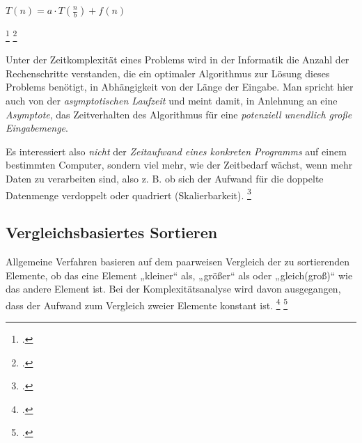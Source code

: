 \documentclass{lehramt-informatik-haupt}
\begin{document}
$T(n) = a \cdot T(\frac{n}{b}) + f(n)$

\footcite{wiki:master-theorem}
\footcite[Seite 19-35 (PDF 11-24)]{aud:fs:2}

%

\begin{liExkurs}%
Unter der Zeitkomplexität eines Problems wird in der Informatik die
Anzahl der Rechenschritte verstanden, die ein optimaler Algorithmus zur
Lösung dieses Problems benötigt, in Abhängigkeit von der Länge der
Eingabe. Man spricht hier auch von der \emph{asymptotischen Laufzeit}
und meint damit, in Anlehnung an eine \emph{Asymptote}, das
Zeitverhalten des Algorithmus für eine \emph{potenziell unendlich große
Eingabemenge}.

Es interessiert also \emph{nicht} der \emph{Zeitaufwand eines konkreten
Programms} auf einem bestimmten Computer, sondern viel mehr, wie der
Zeitbedarf wächst, wenn mehr Daten zu verarbeiten sind, also z. B. ob
sich der Aufwand für die doppelte Datenmenge verdoppelt oder quadriert
(Skalierbarkeit).
\footcite{wiki:zeitkomplexitaet}
\end{liExkurs}

\subsection{Vergleichsbasiertes Sortieren}

Allgemeine Verfahren basieren auf dem paarweisen Vergleich der zu
sortierenden Elemente, ob das eine Element „kleiner“ als, „größer“ als
oder „gleich(groß)“ wie das andere Element ist. Bei der
Komplexitätsanalyse wird davon ausgegangen, dass der Aufwand zum
Vergleich zweier Elemente konstant ist.
\footcite{wiki:sortierverfahren}
\footcite[Seite 35 (PDF 24)]{aud:fs:2}
\end{document}
